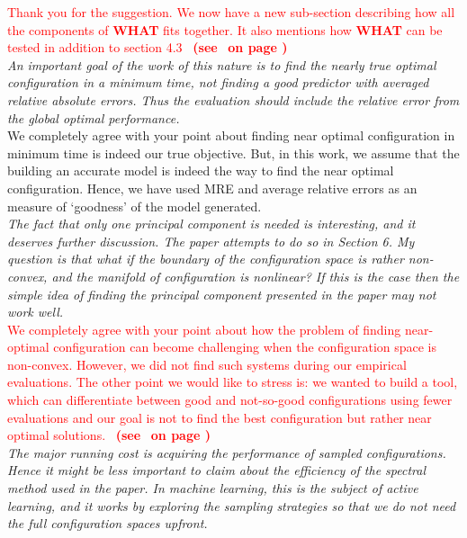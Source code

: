 \documentclass[smallextended]{svjour3}       %
\newcommand{\review}[1]{{\textit{#1}}~\\}
\newcommand{\citeresp}[1]{
{\bf (see } \fcolorbox{black}{black!15}{
 \bf
  \scriptsize R-{#1}}~{\bf{on page \pageref{response:#1})}}
}
\newcommand{\what}{{\bf WHAT}\xspace}
\begin{document}
\noindent
\textcolor{red}{Thank you for the suggestion. We now have a new sub-section describing how all the components of \what{} fits together. It also mentions how \what{} can be tested in addition to section 4.3~\citeresp{1c}}\\

\noindent
\review{An important goal of the work of this nature is to find the nearly true optimal configuration in a minimum time, not finding a good predictor with averaged relative absolute errors. Thus the evaluation should include the relative error from the global optimal performance.}

\noindent
We completely agree with your point about finding near optimal configuration in minimum time is indeed our true objective. But, in this work, we assume that the building an accurate model is indeed the way to find the near optimal configuration. Hence, we have used MRE and average relative errors as an measure of `goodness' of the model generated.\\

\noindent
\review{The fact that only one principal component is needed is interesting, and it deserves further discussion. The paper attempts to do so in Section 6. My question is that what if the boundary of the configuration space is rather non-convex, and the manifold of configuration is nonlinear? If this is the case then the simple idea of finding the principal component presented in the paper may not work well.
}

\noindent
\textcolor{red}{We completely agree with your point about how the problem of finding near-optimal configuration can become challenging when the configuration space is non-convex. However, we did not find such systems during our empirical evaluations. The other point we would like to stress is: we wanted to build a tool, which can differentiate between good and not-so-good configurations using fewer evaluations and our goal is not to find the best configuration but rather near optimal solutions.~\citeresp{2a}}\\

\noindent
\review{The major running cost is acquiring the performance of sampled configurations. Hence it might be less important to claim about the efficiency of the spectral method used in the paper. In machine learning, this is the subject of active learning, and it works by exploring the sampling strategies so that we do not need the full configuration spaces upfront.}\\
\end{document}
